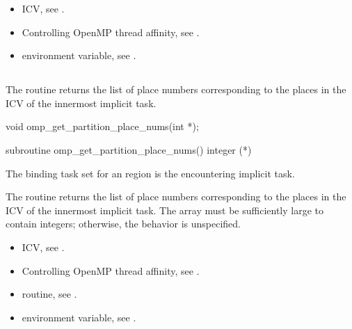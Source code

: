\crossreferences
\begin{itemize}
\item {} ICV, see
.

\item Controlling OpenMP thread affinity, see
.

\item {} environment variable, see
.
\end{itemize}





\subsection{}
\label{subsec:omp_get_partition_place_nums}

\summary
The  routine returns the list of place numbers corresponding to the places in the  ICV of the innermost implicit task.

\format
\begin{ccppspecific}
\begin{ompcFunction}
void omp_get_partition_place_nums(int *);
\end{ompcFunction}
\end{ccppspecific}

\begin{fortranspecific}
\begin{ompfSubroutine}
subroutine omp_get_partition_place_nums()
integer (*)
\end{ompfSubroutine}
\end{fortranspecific}

\binding
The binding task set for an  region is the encountering implicit task.

\effect
The  routine returns the list of
place numbers corresponding to the places in the 
ICV of the innermost implicit task. The array must be sufficiently large
to contain  integers; otherwise,
the behavior is unspecified.

\crossreferences
\begin{itemize}
\item {} ICV, see
.

\item Controlling OpenMP thread affinity, see
.

\item {} routine, see
.

\item {} environment variable, see
.
\end{itemize}

